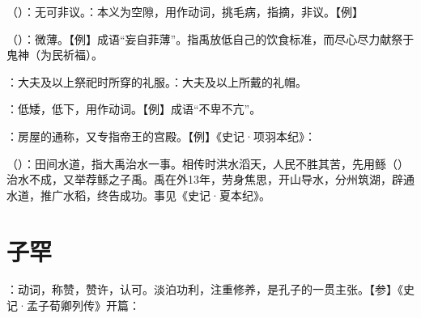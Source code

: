 {
\item {}（）：无可非议。：本义为空隙，用作动词，挑毛病，指摘，非议。【例】 
\item {}（）：微薄。【例】成语“妄自菲薄”。指禹放低自己的饮食标准，而尽心尽力献祭于鬼神（为民祈福）。

\item {}：大夫及以上祭祀时所穿的礼服。：大夫及以上所戴的礼帽。
\item {}：低矮，低下，用作动词。【例】成语“不卑不亢”。
\item {}：房屋的通称，又专指帝王的宫殿。【例】《史记·项羽本纪》：

\item {}（）：田间水道，指大禹治水一事。相传时洪水滔天，人民不胜其苦，先用鲧（）治水不成，又举荐鲧之子禹。禹在外13年，劳身焦思，开山导水，分州筑湖，辟通水道，推广水稻，终告成功。事见《史记·夏本纪》。
}
{}



\chapter{子罕}

{
\item {}：动词，称赞，赞许，认可。淡泊功利，注重修养，是孔子的一贯主张。【参】《史记·孟子荀卿列传》开篇：
}
{}  %



